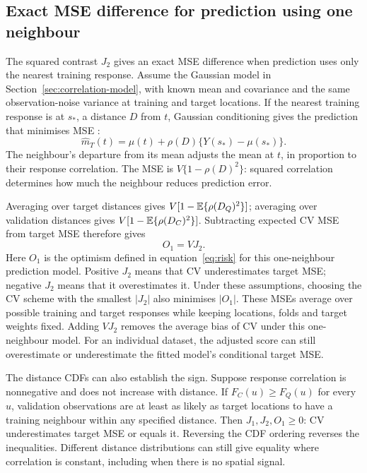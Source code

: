\subsection{Exact MSE difference for prediction using one neighbour}
\label{sec:one-neighbour}
The squared contrast $J_2$ gives an exact MSE difference when prediction uses only the nearest training response. Assume the Gaussian model in Section~\ref{sec:correlation-model}, with known mean and covariance and the same observation-noise variance at training and target locations. If the nearest training response is at $s_*$, a distance $D$ from $t$, Gaussian conditioning gives the prediction that minimises MSE \citep[Chapter~2]{rasmussen2006gpml}:
\[
 \widehat m_T(t)=\mu(t)+\rho(D)\{Y(s_*)-\mu(s_*)\}.
\]
The neighbour's departure from its mean adjusts the mean at $t$, in proportion to their response correlation. The MSE is $V\{1-\rho(D)^2\}$: squared correlation determines how much the neighbour reduces prediction error.

Averaging over target distances gives $V[1-\mathbb{E}\{\rho(D_Q)^2\}]$; averaging over validation distances gives $V[1-\mathbb{E}\{\rho(D_C)^2\}]$. Subtracting expected CV MSE from target MSE therefore gives
\begin{equation}
 O_1=VJ_2.\label{eq:one}
\end{equation}
Here $O_1$ is the optimism defined in equation~\eqref{eq:risk} for this one-neighbour prediction model. Positive $J_2$ means that CV underestimates target MSE; negative $J_2$ means that it overestimates it. Under these assumptions, choosing the CV scheme with the smallest $|J_2|$ also minimises $|O_1|$. These MSEs average over possible training and target responses while keeping locations, folds and target weights fixed. Adding $VJ_2$ removes the average bias of CV under this one-neighbour model. For an individual dataset, the adjusted score can still overestimate or underestimate the fitted model's conditional target MSE.

The distance CDFs can also establish the sign. Suppose response correlation is nonnegative and does not increase with distance. If $F_C(u)\geq F_Q(u)$ for every $u$, validation observations are at least as likely as target locations to have a training neighbour within any specified distance. Then $J_1,J_2,O_1\geq0$: CV underestimates target MSE or equals it. Reversing the CDF ordering reverses the inequalities. Different distance distributions can still give equality where correlation is constant, including when there is no spatial signal.

